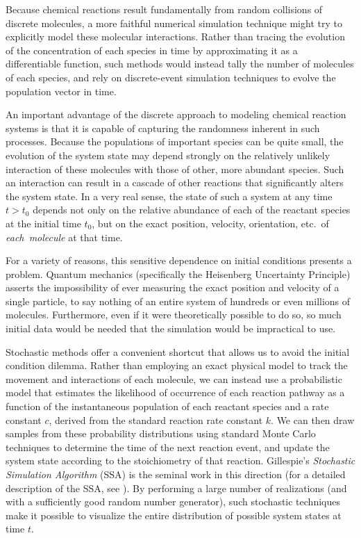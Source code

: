 \documentclass[12pt]{article}
\begin{document}
Because chemical reactions result fundamentally from random collisions
of discrete molecules, a more faithful numerical simulation technique
might try to explicitly model these molecular interactions.  Rather
than tracing the evolution of the concentration of each species in
time by approximating it as a differentiable function, such methods
would instead tally the number of molecules of each species, and rely
on discrete-event simulation techniques to evolve the population
vector in time.

An important advantage of the discrete approach to modeling chemical
reaction systems is that it is capable of capturing the randomness
inherent in such processes.  Because the populations of important
species can be quite small, the evolution of the system state may
depend strongly on the relatively unlikely interaction of these
molecules with those of other, more abundant species.  Such an
interaction can result in a cascade of other reactions that
significantly alters the system state.  In a very real sense, the
state of such a system at any time $t > t_0$ depends not only on the
relative abundance of each of the reactant species at the initial time
$t_0$, but on the exact position, velocity, orientation, etc.\ of
\emph{each~molecule} at that time.

For a variety of reasons, this sensitive dependence on initial
conditions presents a problem.  Quantum mechanics (specifically the
Heisenberg Uncertainty Principle) asserts the impossibility of ever
measuring the exact position and velocity of a single particle, to say
nothing of an entire system of hundreds or even millions of molecules.
Furthermore, even if it were theoretically possible to do so, so much
initial data would be needed that the simulation would be impractical
to use.

Stochastic methods offer a convenient shortcut that allows us to avoid
the initial condition dilemma.  Rather than employing an exact
physical model to track the movement and interactions of each
molecule, we can instead use a probabilistic model that estimates the
likelihood of occurrence of each reaction pathway as a function of the
instantaneous population of each reactant species and a rate
constant $c$, derived from the standard reaction rate
constant $k$\cite{Gillespie76}.  
We can then draw samples from these probability
distributions using standard Monte Carlo techniques to determine the
time of the next reaction event, and update the system state according
to the stoichiometry of that reaction.  Gillespie's \emph{Stochastic
Simulation Algorithm} (SSA) \cite{Gillespie76, Gillespie77} is the
seminal work in this direction (for a detailed description of the SSA,
see \cite{Gillespie76, Gillespie77}). By performing a large number of
realizations (and with a sufficiently good random number generator),
such stochastic techniques make it possible to visualize the entire
distribution of possible system states at time $t$.
\end{document}
